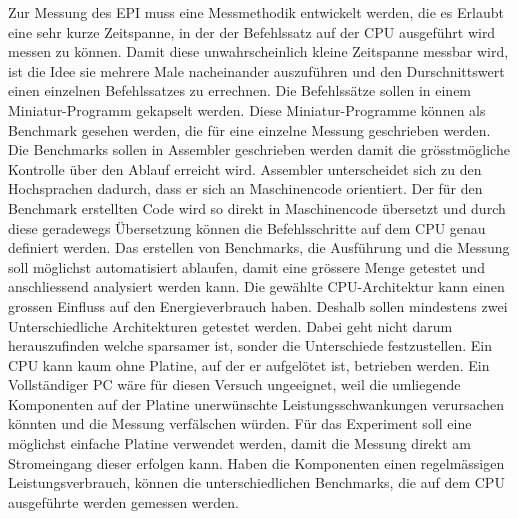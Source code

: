 Zur Messung des EPI muss eine Messmethodik entwickelt werden, die es Erlaubt eine sehr kurze Zeitspanne, in der der Befehlssatz auf der CPU ausgeführt wird messen zu können. Damit diese unwahrscheinlich kleine Zeitspanne messbar wird, ist die Idee sie mehrere Male nacheinander auszuführen und den Durschnittswert einen einzelnen Befehlssatzes zu errechnen. Die Befehlssätze sollen in einem Miniatur-Programm gekapselt werden. Diese Miniatur-Programme können als Benchmark gesehen werden, die für eine einzelne Messung geschrieben werden. Die Benchmarks sollen in Assembler geschrieben werden damit die grösstmögliche Kontrolle über den Ablauf erreicht wird. Assembler unterscheidet sich zu den Hochsprachen dadurch, dass er sich an Maschinencode orientiert. Der für den Benchmark erstellten Code wird so direkt in Maschinencode übersetzt und durch diese geradewegs Übersetzung können die Befehlsschritte auf dem CPU genau definiert werden. Das erstellen von Benchmarks, die Ausführung und die Messung soll möglichst automatisiert ablaufen, damit eine grössere Menge getestet und anschliessend analysiert werden kann. Die gewählte CPU-Architektur kann einen grossen Einfluss auf den Energieverbrauch haben. Deshalb sollen mindestens zwei Unterschiedliche Architekturen getestet werden. Dabei geht nicht darum herauszufinden welche sparsamer ist, sonder die Unterschiede festzustellen. Ein CPU kann kaum ohne Platine, auf der er aufgelötet ist, betrieben werden. Ein Vollständiger PC wäre für diesen Versuch ungeeignet, weil die umliegende Komponenten auf der Platine unerwünschte Leistungsschwankungen verursachen könnten und die Messung verfälschen würden. Für das Experiment soll eine möglichst einfache Platine verwendet werden, damit die Messung direkt am Stromeingang dieser erfolgen kann. Haben die Komponenten einen regelmässigen Leistungsverbrauch, können die unterschiedlichen Benchmarks, die auf dem CPU ausgeführte werden gemessen werden.
